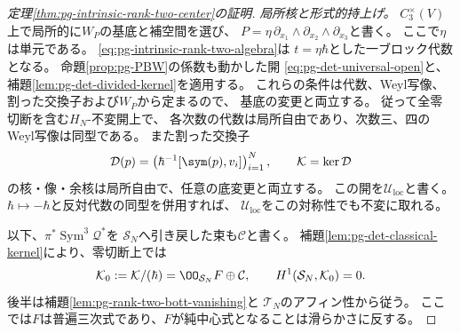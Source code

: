 \begin{proof}[定理\ref{thm:pg-intrinsic-rank-two-center}の証明]
\emph{局所核と形式的持上げ。}
$C_3^\times(V)$上で局所的に$W_P$の基底と補空間を選び、
$P=\eta\,\partial_{x_1}\wedge\partial_{x_2}\wedge\partial_{x_3}$と書く。
ここで$\eta$は単元である。
\eqref{eq:pg-intrinsic-rank-two-algebra}は
$t=\eta\hbar$とした一ブロック代数となる。
命題\ref{prop:pg-PBW}の係数も動かした開
\eqref{eq:pg-det-universal-open}と、
補題\ref{lem:pg-det-divided-kernel}を適用する。
これらの条件は代数、Weyl写像、割った交換子および$W_P$から定まるので、
基底の変更と両立する。
従って全零切断を含む$H_N$-不変開上で、
各次数の代数は局所自由であり、次数三、四のWeyl写像は同型である。
また割った交換子
\begin{equation}
 \mathcal D(p)=
 \left(\hbar^{-1}[\sym(p),v_i]\right)_{i=1}^N,
 \qquad \mathcal K=\ker\mathcal D
 \label{eq:pg-intrinsic-rank-two-divided-map}
\end{equation}
の核・像・余核は局所自由で、任意の底変更と両立する。
この開を$\mathcal U_{\mathrm{loc}}$と書く。
$\hbar\mapsto-\hbar$と反対代数の同型を併用すれば、
$\mathcal U_{\mathrm{loc}}$をこの対称性でも不変に取れる。

以下、$\pi^*\operatorname{Sym}^3\mathcal Q^*$を
$\mathcal S_N$へ引き戻した束も$\mathcal C$と書く。
補題\ref{lem:pg-det-classical-kernel}により、零切断上では
\begin{equation}
 \mathcal K_0:=\mathcal K/(\hbar)
     =\OO_{\mathcal S_N}F\oplus\mathcal C,
 \qquad H^1(\mathcal S_N,\mathcal K_0)=0.
 \label{eq:pg-intrinsic-rank-two-classical-splitting}
\end{equation}
後半は補題\ref{lem:pg-rank-two-bott-vanishing}と
$\mathcal T_N$のアフィン性から従う。
ここでは$F$は普遍三次式であり、$F$が純中心式となることは滑らかさに反する。


\end{proof}
